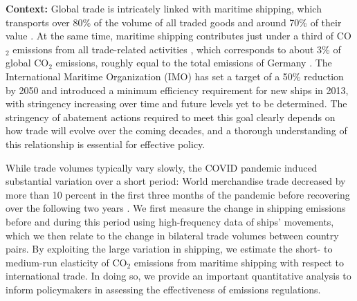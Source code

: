 \documentclass[hidelinks, 12pt,letterpaper]{article}
\begin{document}
\noindent \textbf{Context:} 
Global trade is intricately linked with maritime shipping, which transports over 80\% of the volume of all traded goods and around 70\% of their value .
At the same time, maritime shipping contributes just under a third of CO$_2$ emissions from all trade-related activities \citep{shapiro2016trade}, which corresponds to
about 3\% of global CO$_2$ emissions, roughly equal to the total emissions of Germany \citep{faber2020fourth}. The International Maritime Organization (IMO) has set a target of a 50\% reduction by 2050 and introduced a minimum efficiency requirement for new ships in 2013, with stringency increasing over time and future levels yet to be determined.    %
The stringency of abatement actions required to meet this goal clearly depends on how trade will evolve over the coming decades, and a thorough understanding of this relationship is essential for effective policy.  %



While trade volumes typically vary slowly, the COVID pandemic induced substantial variation over a short period:
World merchandise trade decreased by more than 10 percent in the first three months of the pandemic before recovering over the following two years \citep{oecd21}. %
We first measure the change in shipping emissions before and during this period using high-frequency data of ships' movements, which we then relate to the change in bilateral trade volumes between country pairs. By exploiting the large variation in shipping, we estimate the short- to medium-run elasticity of CO$_2$ emissions from maritime shipping with respect to international trade. In doing so, we provide an
important quantitative analysis to inform policymakers in assessing the effectiveness of emissions regulations.  %
\end{document}
